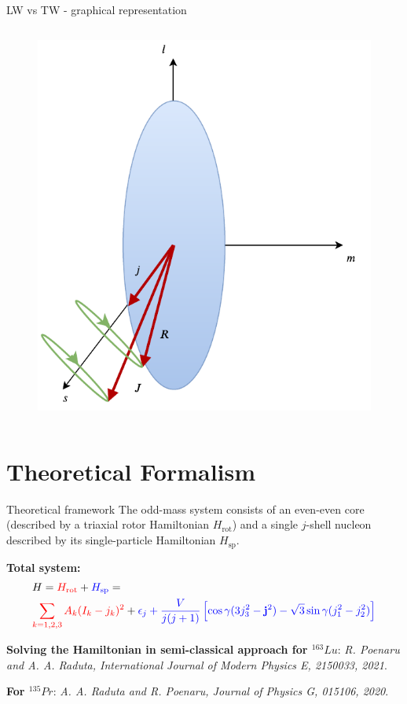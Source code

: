 \documentclass{beamer}
\begin{document}
\begin{frame}{LW vs TW - graphical representation}
\begin{columns}
\begin{column}{0.5\textwidth}
\begin{figure}
  \includegraphics[scale=0.6]{figs/transverseWobbler.pdf}

      \end{figure}
    \end{column}
    \end{columns}

\end{frame}

\section{Theoretical Formalism}

\begin{frame}{Theoretical framework}
  The odd-mass system consists of an {\color{red}even-even core} (described by a triaxial rotor Hamiltonian {\color{red}$H_\text{rot}$}) and a single {\color{blue}$j$-shell nucleon} described by its single-particle Hamiltonian {\color{blue}$H_\text{sp}$}.
  \par \textbf{Total system:}
  \begin{align}
    &H={\color{red}H_\text{rot}}+{\color{blue}H_\text{sp}}=\\
&{\color{red}\sum_{k=1,2,3}A_k(I_k-j_k)^2}+{\color{blue}\epsilon_j+\frac{V}{j(j+1)}\left[\cos\gamma(3j_3^2-\mathbf{j}^2)-\sqrt{3}\sin\gamma(j_1^2-j_2^2)\right]}
  \end{align}
  \par {\footnotesize \textbf{Solving the Hamiltonian in semi-classical approach for $^{163}Lu$}: \textit{R. Poenaru and A. A. Raduta, International Journal of Modern Physics E, 2150033, 2021}.}
  \par {\footnotesize \textbf{For $^{135}Pr$}: \textit{A. A. Raduta and R. Poenaru, Journal of Physics G, 015106, 2020}.}
\end{frame}
\end{document}
